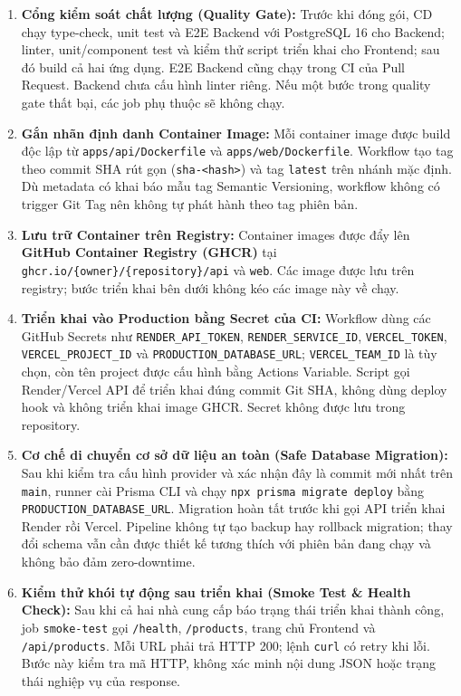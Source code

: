 \documentclass[a4paper]{article}
\begin{document}
\begin{enumerate}
    \item \textbf{Cổng kiểm soát chất lượng (Quality Gate):}
    Trước khi đóng gói, CD chạy type-check, unit test và E2E Backend với PostgreSQL 16 cho Backend; linter, unit/component test và kiểm thử script triển khai cho Frontend; sau đó build cả hai ứng dụng. E2E Backend cũng chạy trong CI của Pull Request. Backend chưa cấu hình linter riêng. Nếu một bước trong quality gate thất bại, các job phụ thuộc sẽ không chạy.

    \item \textbf{Gắn nhãn định danh Container Image:}
    Mỗi container image được build độc lập từ \texttt{apps/api/Dockerfile} và \texttt{apps/web/Dockerfile}. Workflow tạo tag theo commit SHA rút gọn (\texttt{sha-<hash>}) và tag \texttt{latest} trên nhánh mặc định. Dù metadata có khai báo mẫu tag Semantic Versioning, workflow không có trigger Git Tag nên không tự phát hành theo tag phiên bản.

    \item \textbf{Lưu trữ Container trên Registry:}
    Container images được đẩy lên \textbf{GitHub Container Registry (GHCR)} tại \texttt{ghcr.io/\{owner\}/\{repository\}/api} và \texttt{web}. Các image được lưu trên registry; bước triển khai bên dưới không kéo các image này về chạy.

    \item \textbf{Triển khai vào Production bằng Secret của CI:}
    Workflow dùng các GitHub Secrets như \texttt{RENDER\_API\_TOKEN}, \texttt{RENDER\_SERVICE\_ID}, \texttt{VERCEL\_TOKEN}, \texttt{VERCEL\_PROJECT\_ID} và \texttt{PRODUCTION\_DATABASE\_URL}; \texttt{VERCEL\_TEAM\_ID} là tùy chọn, còn tên project được cấu hình bằng Actions Variable. Script gọi Render/Vercel API để triển khai đúng commit Git SHA, không dùng deploy hook và không triển khai image GHCR. Secret không được lưu trong repository.

    \item \textbf{Cơ chế di chuyển cơ sở dữ liệu an toàn (Safe Database Migration):}
    Sau khi kiểm tra cấu hình provider và xác nhận đây là commit mới nhất trên \texttt{main}, runner cài Prisma CLI và chạy \texttt{npx prisma migrate deploy} bằng \texttt{PRODUCTION\_DATABASE\_URL}. Migration hoàn tất trước khi gọi API triển khai Render rồi Vercel. Pipeline không tự tạo backup hay rollback migration; thay đổi schema vẫn cần được thiết kế tương thích với phiên bản đang chạy và không bảo đảm zero-downtime.

    \item \textbf{Kiểm thử khói tự động sau triển khai (Smoke Test \& Health Check):}
    Sau khi cả hai nhà cung cấp báo trạng thái triển khai thành công, job \texttt{smoke-test} gọi \texttt{/health}, \texttt{/products}, trang chủ Frontend và \texttt{/api/products}. Mỗi URL phải trả HTTP 200; lệnh \texttt{curl} có retry khi lỗi. Bước này kiểm tra mã HTTP, không xác minh nội dung JSON hoặc trạng thái nghiệp vụ của response.


\end{enumerate}
\end{document}
